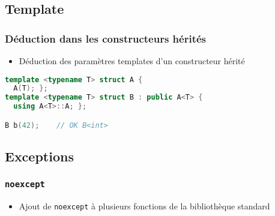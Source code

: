 \documentclass[C++.tex]{subfiles}
\begin{document}
\subsection*{Template}
\begin{frame}[fragile]
	\frametitle{Déduction dans les constructeurs hérités}
	\begin{itemize}
		\item Déduction des paramètres templates d'un constructeur hérité
	\end{itemize}

	\begin{lstlisting}[language=C++]
template <typename T> struct A {
  A(T); };
template <typename T> struct B : public A<T> {
  using A<T>::A; };

B b(42);	// OK B<int>\end{lstlisting}
\end{frame}

\subsection*{Exceptions}
\begin{frame}[fragile]
	\frametitle{\lstinline|noexcept|}
	\begin{itemize}
		\item Ajout de \lstinline|noexcept| à plusieurs fonctions de la bibliothèque standard
	\end{itemize}
\end{frame}
\end{document}
